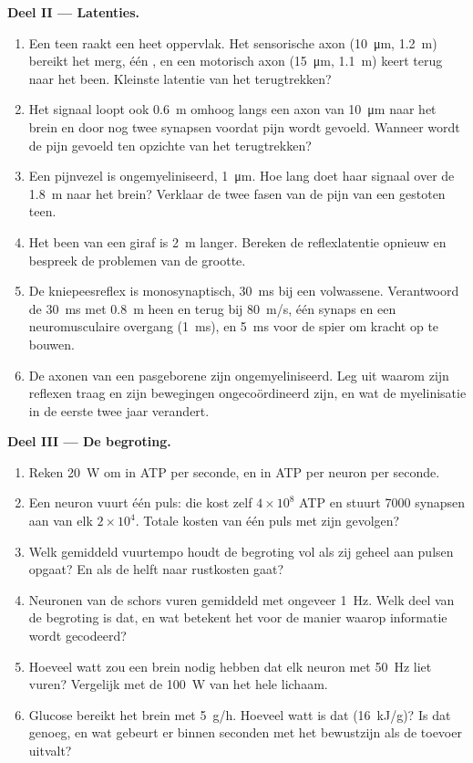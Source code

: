 \begin{problem}
\medskip
\noindent\textbf{Deel II --- Latenties.}
\begin{enumerate}[resume]
  \item Een teen raakt een heet oppervlak. Het sensorische axon
        (\qty{10}{\micro m}, \qty{1.2}{m}) bereikt het merg, één
        , en een motorisch axon (\qty{15}{\micro m},
        \qty{1.1}{m}) keert terug naar het been. Kleinste latentie van
        het terugtrekken?
  \item Het signaal loopt ook \qty{0.6}{m} omhoog langs een axon van
        \qty{10}{\micro m} naar het brein en door nog twee synapsen
        voordat pijn wordt gevoeld. Wanneer wordt de pijn gevoeld ten
        opzichte van het terugtrekken?
  \item Een pijnvezel is ongemyeliniseerd, \qty{1}{\micro m}. Hoe lang
        doet haar signaal over de \qty{1.8}{m} naar het brein? Verklaar
        de twee fasen van de pijn van een gestoten teen.
  \item Het been van een giraf is \qty{2}{m} langer. Bereken de
        reflexlatentie opnieuw en bespreek de problemen van de grootte.
  \item De kniepeesreflex is monosynaptisch, \qty{30}{ms} bij een
        volwassene. Verantwoord de \qty{30}{ms} met \qty{0.8}{m} heen
        en terug bij \qty{80}{m/s}, één synaps en een neuromusculaire
        overgang (\qty{1}{ms}), en \qty{5}{ms} voor de spier om kracht
        op te bouwen.
  \item De axonen van een pasgeborene zijn ongemyeliniseerd. Leg uit
        waarom zijn reflexen traag en zijn bewegingen ongecoördineerd
        zijn, en wat de myelinisatie in de eerste twee jaar verandert.
\end{enumerate}

\medskip
\noindent\textbf{Deel III --- De begroting.}
\begin{enumerate}[resume]
  \item Reken \qty{20}{W} om in ATP per seconde, en in ATP per neuron
        per seconde.
  \item Een neuron vuurt één puls: die kost zelf $4\times 10^{8}$ ATP
        en stuurt \num{7000} synapsen aan van elk $2\times 10^{4}$.
        Totale kosten van één puls met zijn gevolgen?
  \item Welk gemiddeld vuurtempo houdt de begroting vol als zij geheel
        aan pulsen opgaat? En als de helft naar rustkosten gaat?
  \item Neuronen van de schors vuren gemiddeld met ongeveer
        \qty{1}{Hz}. Welk deel van de begroting is dat, en wat betekent
        het voor de manier waarop informatie wordt gecodeerd?
  \item Hoeveel watt zou een brein nodig hebben dat elk neuron met
        \qty{50}{Hz} liet vuren? Vergelijk met de \qty{100}{W} van het
        hele lichaam.
  \item Glucose bereikt het brein met \qty{5}{g/h}. Hoeveel watt is dat
        (\qty{16}{kJ/g})? Is dat genoeg, en wat gebeurt er binnen
        seconden met het bewustzijn als de toevoer uitvalt?
\end{enumerate}


\end{problem}
